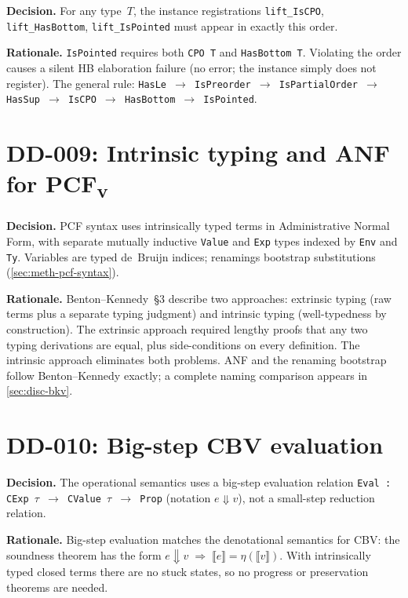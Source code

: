 \textbf{Decision.}
For any type~$T$, the instance registrations \texttt{lift\_IsCPO},
\texttt{lift\_HasBottom}, \texttt{lift\_IsPointed} must appear in exactly
this order.

\textbf{Rationale.}
\texttt{IsPointed} requires both \texttt{CPO~T} and
\texttt{HasBottom~T}.  Violating the order causes a silent HB
elaboration failure (no error; the instance simply does not register).
The general rule: \texttt{HasLe $\to$ IsPreorder $\to$ IsPartialOrder
$\to$ HasSup $\to$ IsCPO $\to$ HasBottom $\to$ IsPointed}.

\section*{DD-009: Intrinsic typing and ANF for PCF\textsubscript{v}}

\textbf{Decision.}
PCF syntax uses intrinsically typed terms in Administrative Normal Form,
with separate mutually inductive \texttt{Value} and \texttt{Exp} types
indexed by \texttt{Env} and \texttt{Ty}.  Variables are typed de~Bruijn
indices; renamings bootstrap substitutions
(\cref{sec:meth-pcf-syntax}).

\textbf{Rationale.}
Benton--Kennedy~\S3 describe two approaches: extrinsic typing (raw terms
plus a separate typing judgment) and intrinsic typing (well-typedness by
construction).  The extrinsic approach required lengthy proofs that any
two typing derivations are equal, plus side-conditions on every
definition.  The intrinsic approach eliminates both problems.  ANF and
the renaming bootstrap follow Benton--Kennedy exactly; a complete naming
comparison appears in \cref{sec:disc-bkv}.

\section*{DD-010: Big-step CBV evaluation}

\textbf{Decision.}
The operational semantics uses a big-step evaluation relation
\texttt{Eval : CExp\,$\tau$ $\to$ CValue\,$\tau$ $\to$ Prop}
(notation $e \Downarrow v$), not a small-step reduction relation.

\textbf{Rationale.}
Big-step evaluation matches the denotational semantics for CBV: the
soundness theorem has the form
$e \Downarrow v \;\Rightarrow\; \llbracket e \rrbracket = \eta(\llbracket v \rrbracket)$.
With intrinsically typed closed terms there are no stuck states, so no
progress or preservation theorems are needed.

